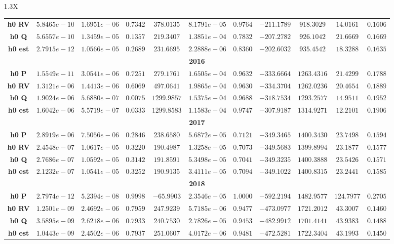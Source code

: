 \documentclass[10pt]{article}
\begin{document}
{\begin{tabularx}{1.3\textwidth}{X}
{\begin{tabular}{ccccccccccc}
 { {\bf h0 RV}}& $5.8465e-10$ & $1.6951e-06$ & $0.7342$ & $378.0135$ & $8.1791e-05$ & $0.9764$ & $-211.1789$& $918.3029$& $14.0161$ &$0.1606$\\
 { {\bf h0 Q}}& $5.6557e-10$ & $1.3459e-05$ & $0.1357$ & $219.3407$ & $1.3851e-04$ & $0.7832$ & $-207.2782$& $926.1042$& $21.6669$ &$0.1669$\\
 { {\bf h0 est}}& $2.7915e-12$ & $1.0566e-05$ & $0.2689$ & $231.6695$ & $2.2888e-06$ & $0.8360$ & $-202.6032$& $935.4542$& $18.3288$ &$0.1635$\\
\bottomrule
\multicolumn{11}{c}{{\bf2016}} \\
\cmidrule(r){1-11} 
 { {\bf h0 P}}& $1.5549e-11$ & $3.0541e-06$ & $0.7251$ & $279.1761$ & $1.6505e-04$ & $0.9632$ & $-333.6664$& $1263.4316$& $21.4299$ &$0.1788$\\
 { {\bf h0 RV}}& $1.3121e-06$ & $1.4413e-06$ & $0.6069$ & $497.0641$ & $1.9865e-04$ & $0.9630$ & $-334.3704$& $1262.0236$& $20.4654$ &$0.1889$\\
 { {\bf h0 Q}}& $1.9024e-06$ & $5.6880e-07$ & $0.0075$ & $1299.9857$ & $1.5375e-04$ & $0.9688$ & $-318.7534$& $1293.2577$& $14.9511$ &$0.1952$\\
 { {\bf h0 est}}& $1.6042e-06$ & $5.5719e-07$ & $0.0333$ & $1299.8583$ & $1.1583e-04$ & $0.9747$ & $-307.9187$& $1314.9271$& $12.2101$ &$0.1906$\\
\bottomrule
\multicolumn{11}{c}{{\bf2017}} \\
\cmidrule(r){1-11} 
 { {\bf h0 P}}& $2.8919e-06$ & $7.5056e-06$ & $0.2846$ & $238.6580$ & $5.6872e-05$ & $0.7121$ & $-349.3465$& $1400.3430$& $23.7498$ &$0.1594$\\
 { {\bf h0 RV}}& $2.4548e-07$ & $1.0617e-05$ & $0.3220$ & $190.4987$ & $1.3258e-05$ & $0.7073$ & $-349.5683$& $1399.8994$& $23.1877$ &$0.1577$\\
 { {\bf h0 Q}}& $2.7686e-07$ & $1.0592e-05$ & $0.3142$ & $191.8591$ & $5.3498e-05$ & $0.7041$ & $-349.3235$& $1400.3888$& $23.5426$ &$0.1571$\\
 { {\bf h0 est}}& $2.1232e-07$ & $1.0541e-05$ & $0.3252$ & $190.9135$ & $3.4111e-05$ & $0.7094$ & $-349.1022$& $1400.8315$& $23.2441$ &$0.1585$\\
\bottomrule
\multicolumn{11}{c}{{\bf2018}} \\
\cmidrule(r){1-11} 
 { {\bf h0 P}}& $2.7974e-12$ & $5.2394e-08$ & $0.9998$ & $-65.9903$ & $2.3546e-05$ & $1.0000$ & $-592.2194$& $1482.9577$& $124.7977$ &$0.2705$\\
 { {\bf h0 RV}}& $1.2501e-09$ & $2.4692e-06$ & $0.7959$ & $247.9239$ & $5.7185e-06$ & $0.9477$ & $-473.0977$& $1721.2012$& $43.3007$ &$0.1460$\\
 { {\bf h0 Q}}& $3.5895e-09$ & $2.6218e-06$ & $0.7933$ & $240.7530$ & $2.7826e-05$ & $0.9453$ & $-482.9912$& $1701.4141$& $43.9383$ &$0.1488$\\
 { {\bf h0 est}}& $1.0443e-09$ & $2.4502e-06$ & $0.7937$ & $251.0607$ & $4.0172e-06$ & $0.9481$ & $-472.5281$& $1722.3404$& $43.1993$ &$0.1450$\\
\bottomrule
\end{tabular}}
\end{tabularx}}

  \vspace{3 cm}

  
\end{document}
